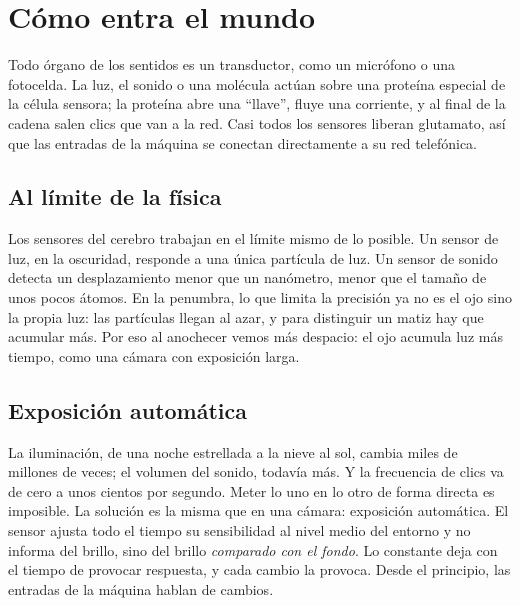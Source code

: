 \chapter{Cómo entra el mundo}

Todo órgano de los sentidos es un transductor, como un micrófono o una fotocelda. La luz, el sonido o una molécula actúan sobre una proteína especial de la célula sensora; la proteína abre una “llave”, fluye una corriente, y al final de la cadena salen clics que van a la red. Casi todos los sensores liberan glutamato, así que las entradas de la máquina se conectan directamente a su red telefónica.

\section*{Al límite de la física}

Los sensores del cerebro trabajan en el límite mismo de lo posible. Un sensor de luz, en la oscuridad, responde a una única partícula de luz. Un sensor de sonido detecta un desplazamiento menor que un nanómetro, menor que el tamaño de unos pocos átomos. En la penumbra, lo que limita la precisión ya no es el ojo sino la propia luz: las partículas llegan al azar, y para distinguir un matiz hay que acumular más. Por eso al anochecer vemos más despacio: el ojo acumula luz más tiempo, como una cámara con exposición larga.

\section*{Exposición automática}

La iluminación, de una noche estrellada a la nieve al sol, cambia miles de millones de veces; el volumen del sonido, todavía más. Y la frecuencia de clics va de cero a unos cientos por segundo. Meter lo uno en lo otro de forma directa es imposible. La solución es la misma que en una cámara: exposición automática. El sensor ajusta todo el tiempo su sensibilidad al nivel medio del entorno y no informa del brillo, sino del brillo \emph{comparado con el fondo}. Lo constante deja con el tiempo de provocar respuesta, y cada cambio la provoca. Desde el principio, las entradas de la máquina hablan de cambios.

